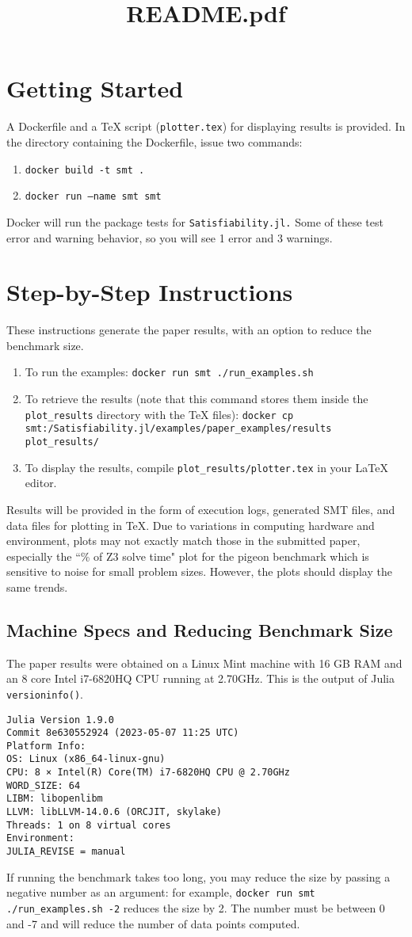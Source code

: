\documentclass{article}
\begin{document}
\title{README.pdf}

\section*{Getting Started}

A Dockerfile and a TeX script (\texttt{plotter.tex}) for displaying results is provided. In the directory containing the Dockerfile, issue two commands:
\begin{enumerate}
\item \texttt{docker build -t smt .}
\item \texttt{docker run --name smt smt}
\end{enumerate}
Docker will run the package tests for \verb|Satisfiability.jl.| Some of these test error and warning behavior, so you will see 1 error and 3 warnings.

\section*{Step-by-Step Instructions}
These instructions generate the paper results, with an option to reduce the benchmark size.
\begin{enumerate}
	\item To run the examples: \texttt{docker run smt ./run\_examples.sh}
\item To retrieve the results (note that this command stores them inside the \texttt{plot\_results} directory with the TeX files):
\texttt{docker cp smt:/Satisfiability.jl/examples/paper\_examples/results plot\_results/}
\item To display the results, compile \texttt{plot\_results/plotter.tex} in your LaTeX editor.
\end{enumerate}
Results will be provided in the form of execution logs, generated SMT files, and data files for plotting in TeX. Due to variations in computing hardware and environment, plots may not exactly match those in the submitted paper, especially the ``\% of Z3 solve time" plot for the pigeon benchmark which is sensitive to noise for small problem sizes. However, the plots should display the same trends.

\subsection*{Machine Specs and Reducing Benchmark Size}
The paper results were obtained on a Linux Mint machine with 16 GB RAM and an 8 core Intel i7-6820HQ CPU running at 2.70GHz. This is the output of Julia \verb|versioninfo()|.
\begin{verbatim}
Julia Version 1.9.0
Commit 8e630552924 (2023-05-07 11:25 UTC)
Platform Info:
OS: Linux (x86_64-linux-gnu)
CPU: 8 × Intel(R) Core(TM) i7-6820HQ CPU @ 2.70GHz
WORD_SIZE: 64
LIBM: libopenlibm
LLVM: libLLVM-14.0.6 (ORCJIT, skylake)
Threads: 1 on 8 virtual cores
Environment:
JULIA_REVISE = manual
\end{verbatim}

If running the benchmark takes too long, you may reduce the size by passing a negative number as an argument: for example, \texttt{docker run smt ./run\_examples.sh -2} reduces the size by 2. The number must be between 0 and -7 and will reduce the number of data points computed.
\end{document}
